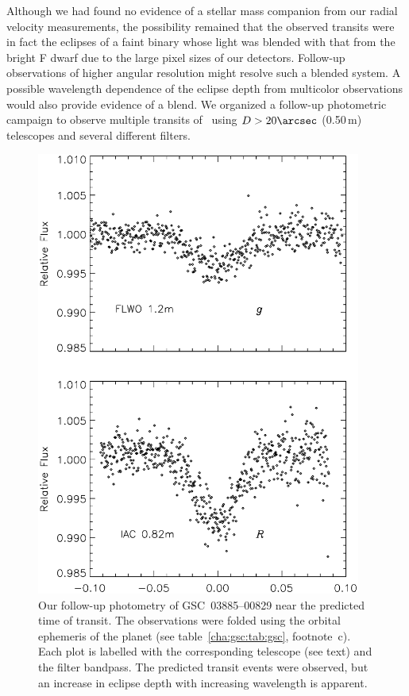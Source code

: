 Although we had found no evidence of a stellar mass companion from our
radial velocity measurements, the possibility remained that the
observed transits were in fact the eclipses of a faint binary whose
light was blended with that from the bright F dwarf due to the large
pixel sizes of our detectors. Follow-up observations of higher
angular resolution might resolve such a blended system. A possible
wavelength dependence of the eclipse depth from multicolor
observations would also provide evidence of a blend. We organized a
follow-up photometric campaign to observe multiple transits of \gscOTE\
using $D>20\arcsec$ (0.50\,m) telescopes and several different filters.

\begin{figure}
\begin{center}
\includegraphics[width=0.95\textwidth]{3_f4}
\caption[Color dependence of recovered transits of \mbox{GSC 03885--00829}]{Our follow-up photometry of \mbox{GSC 03885--00829} near
  the predicted time of transit. The observations were folded using
  the orbital ephemeris of the planet (see table~\ref{cha:gsc:tab:gsc}, footnote~c). Each
  plot is labelled with the corresponding telescope (see text) and
  the filter bandpass. The predicted transit events were observed, but
  an increase in eclipse depth with increasing wavelength is
  apparent.}\label{cha:gsc:fig:multicolor}
\end{center}
\end{figure}

